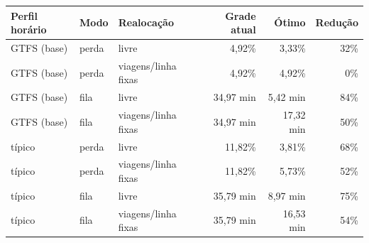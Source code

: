 \begin{tabular}{lllrrr}
\toprule
Perfil horário & Modo & Realocação & Grade atual & Ótimo & Redução \\
\midrule
GTFS (base) & perda & livre & 4{,}92\% & 3{,}33\% & 32\% \\
GTFS (base) & perda & viagens/linha fixas & 4{,}92\% & 4{,}92\% & 0\% \\
GTFS (base) & fila & livre & 34{,}97 min & 5{,}42 min & 84\% \\
GTFS (base) & fila & viagens/linha fixas & 34{,}97 min & 17{,}32 min & 50\% \\
\midrule
típico & perda & livre & 11{,}82\% & 3{,}81\% & 68\% \\
típico & perda & viagens/linha fixas & 11{,}82\% & 5{,}73\% & 52\% \\
típico & fila & livre & 35{,}79 min & 8{,}97 min & 75\% \\
típico & fila & viagens/linha fixas & 35{,}79 min & 16{,}53 min & 54\% \\
\bottomrule
\end{tabular}
